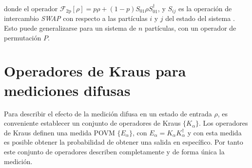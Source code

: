 donde el operador $\mathcal{F}_{\text{2p}}[\rho]=p\rho+(1-p)S_{01}\rho S_{01}^\dagger$, y  $S_{ij}$ es la operación de intercambio \textit{SWAP} con respecto a las partículas $i$ y $j$ del estado del sistema {\cite{Pineda_2021}}. Esto puede generalizarse para un sistema de $n$ partículas, con un operador de permutación $P$.%

 \section{Operadores de Kraus para mediciones difusas}

 Para describir el efecto de la medición difusa en un estado de entrada $\rho$, es conveniente establecer un conjunto de operadores de Kraus $\{K_\alpha\}$. Los operadores de Kraus definen una medida POVM $\{E_\alpha\}$, con $E_\alpha=K_\alpha K_\alpha^\dagger$ y con esta medida es posible obtener la probabilidad de obtener una salida en específico. Por tanto este conjunto de operadores describen completamente y de forma única la medición.%



\begin{comment}
 \subsection{Primera aproximación}
 Primero se considera un sistema conjunto $\mathcal{H}=\mathcal{H}_1\otimes \mathcal{H}_2$, en el que se desea medir el observable $A\otimes B$. Pero el aparato de medición confunde las partículas y con una probabilidad $(1-p) $ realiza la medición del observable $B\otimes A$ (notar que en general $[A\otimes B,B\otimes A]\ne 0$). 
 
 
 Ahora, considerando una medida proyectiva, supongase que el observable es no degenerado y la salida de la medición sobre el estado inicial $\rho $ fue el valor propio $a_j b_k$ con $j,k=0,1$ y el operador de proyección será $P_{a_j,b_k}$. Por lo que el estado después de la medición será 
 
 \begin{equation}
    \begin{split}
        \rho'&= p\dfrac{ P_{a_j,b_k}\rho P_{a_j,b_k}}{\tr(\rho P_{a_j,b_k})}+ (1-p)\dfrac{S P_{a_j,b_k}\rho P_{a_j,b_k}S^\dagger}{\tr(\rho P_{a_j,b_k} S^\dagger SP_{a_j,b_k})}\\
        &=\dfrac{p P_{a_j,b_k}\rho P_{a_j,b_k}+(1-p) S P_{a_j,b_k}\rho P_{a_j,b_k}S^\dagger}{\tr(\rho P_{a_j,b_k})},
    \end{split}
 \end{equation}
 donde $S$ es el operador SWAP\@. Por lo que los operadores de Kraus que describen el efecto de la medición para una medida selectiva serán $\{P_{a_j,b_k}, S P_{a_j,b_k}\}$, con $j,k=0,1$.

\end{comment}